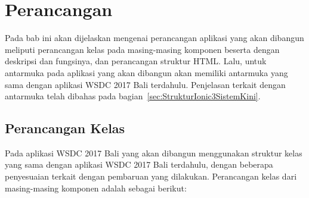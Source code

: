 \chapter{Perancangan}
\label{chap:perancangan}

Pada bab ini akan dijelaskan mengenai perancangan aplikasi yang akan dibangun meliputi perancangan kelas pada masing-masing komponen beserta dengan deskripsi dan fungsinya, dan perancangan struktur HTML. Lalu, untuk antarmuka pada aplikasi yang akan dibangun akan memiliki antarmuka yang sama dengan aplikasi WSDC 2017 Bali terdahulu. Penjelasan terkait dengan antarmuka telah dibahas pada bagian~\ref{sec:StrukturIonic3SistemKini}. 

\section{Perancangan Kelas}
\label{sec:perancanganKelas}

Pada aplikasi WSDC 2017 Bali yang akan dibangun menggunakan struktur kelas yang sama dengan aplikasi WSDC 2017 Bali terdahulu, dengan beberapa penyesuaian terkait dengan pembaruan yang dilakukan. Perancangan kelas dari masing-masing komponen adalah sebagai berikut:

